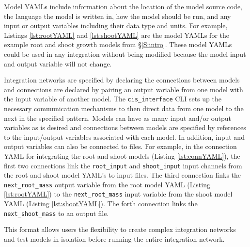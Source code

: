 \documentclass[journal]{IEEEtran}
\newcommand{\cis}{{\tt cis\_interface}{}}
\begin{document}
Model YAMLs include information about the location of the 
model source code, the language the model is written in, how the model should 
be run, and any input or output variables including their data type and units. 
%
\ifcode
For example, Listings \ref{lst:rootYAML} and \ref{lst:shootYAML} are the model YAMLs for the example root and shoot growth models from \S\ref{S:intro}. These model YAMLs could be used in any integration without being modified because the model input and output variable will not change.
%

%

%
\fi
%
Integration networks are specified by declaring the connections 
between models and connections are declared by pairing an output variable from 
one model with the input variable of another model. The {\cis} 
CLI sets up the necessary communication mechanisms to 
then direct data from one model to the next in the specified pattern. Models 
can have as many input and/or output variables as is desired and connections between models are specified by references to the 
input/output variables associated with each model. In addition, input and output variables can also be connected to files.
%
\ifcode
For example, in the connection YAML for integrating the root and shoot models (Listing \ref{lst:connYAML}), the first two connections link the {\tt root\_input} and {\tt shoot\_input} input channels from the root and shoot model YAML's to input files. The third connection links the {\tt next\_root\_mass} output variable from the root model YAML (Listing \ref{lst:rootYAML}) to the {\tt next\_root\_mass} input variable from the shoot model YAML (Listing \ref{lst:shootYAML}). The forth connection links the {\tt next\_shoot\_mass} to an output file.
%

%
\fi
%
This format allows users the 
flexibility to create complex integration networks and test models in isolation before running the entire integration network.


\end{document}
